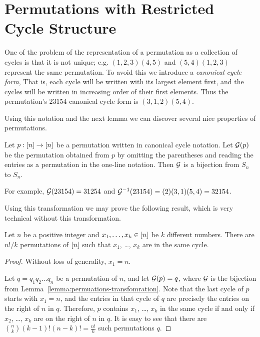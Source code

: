 \section{Permutations with Restricted Cycle Structure}
One of the problem of the representation of a permutation as a collection of
cycles is that it is not unique; e.g. $(1, 2, 3) (4, 5)$ and $(5, 4) (1, 2, 3)$
represent the same permutation. To avoid this we introduce a \emph{canonical
cycle form}, That is, each cycle will be written with its largest element first,
and the cycles will be written in increasing order of their first elements. Thus
the permutation's $2 3 1 5 4$ canonical cycle form is $(3, 1, 2) (5, 4)$.

Using this notation and the next lemma we can discover several nice properties
of permutations.
\begin{lemma}
\label{lemma:permuations-transfomration}
  Let $p : {[{n}]} \to {[{n}]}$ be a permutation written in canonical cycle notation.
  Let $\mathcal{G}(p)$ be the permutation obtained from $p$ by omitting the
  parentheses and reading the entries as a permutation in the one-line notation.
  Then $\mathcal{G}$ is a bijection from $S_n$ to $S_n$.
\end{lemma}
For example, $\mathcal{G}(2 3 1 5 4) = 31254$ and
$\mathcal{G}^{-1}(2 3 1 5 4) = (2) (3, 1) (5, 4) = 32154$.

Using this transformation we may prove the following result, which is very
technical without this transformation.
\begin{theorem}
  Let $n$ be a positive integer and $x_1, \dots, x_k \in {[{n}]}$ be $k$ different
  numbers. There are $n! / k$ permutations of ${[{n}]}$ such that $x_1$, \dots,
  $x_k$ are in the same cycle.
\end{theorem}
\begin{proof}
  Without loss of generality, $x_1 = n$.

  Let $q = q_1 q_2 \dots q_n$ be a permutation of $n$, and let $\mathcal{G}(p) = q$,
  where $\mathcal{G}$ is the bijection from
  Lemma~\ref{lemma:permuations-transfomration}.
  Note that the last cycle of $p$ starts with $x_1 = n$, and the entries in that
  cycle of $q$ are precisely the entries on the right of $n$ in $q$. Therefore,
  $p$ contains $x_1$, \dots, $x_k$ in the same cycle if and only if $x_2$,
  \dots, $x_k$ are on the right of $n$ in $q$. It is easy to see that
  there are $\binom{n}{k} (k - 1)! (n - k)! = \frac{n!}{k}$ such permutations
  $q$.
\end{proof}

